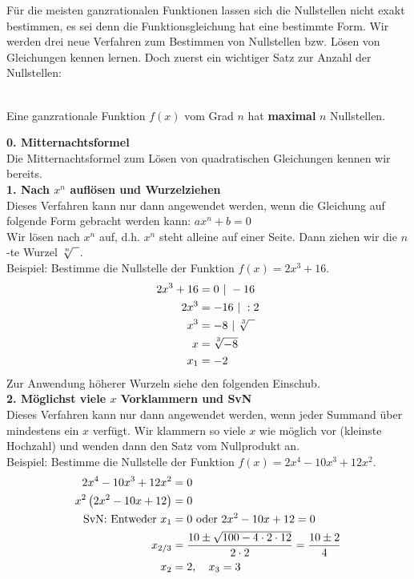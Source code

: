 Für die meisten ganzrationalen Funktionen lassen sich die Nullstellen nicht exakt bestimmen, es sei denn die Funktionsgleichung hat eine bestimmte Form. Wir werden drei neue Verfahren zum Bestimmen von Nullstellen bzw. Lösen von Gleichungen kennen lernen. Doch zuerst ein wichtiger Satz zur Anzahl der Nullstellen:
\begin{tcolorbox}\centering
	\textcolor{loestc}{\vspace{0.3cm}\\Eine ganzrationale Funktion \(f(x)\) vom Grad \(n\) hat \textbf{maximal} \(n\) Nullstellen.\\ \vspace{0.5cm}}
\end{tcolorbox}
\textbf{0. Mitternachtsformel}\\
Die Mitternachtsformel zum Lösen von quadratischen Gleichungen kennen wir bereits.\\
\textbf{1. Nach \(x^n\) auflösen und Wurzelziehen}\\
Dieses Verfahren kann nur dann angewendet werden, wenn die Gleichung auf folgende Form gebracht werden kann: \(ax^n+b=0\)\\
Wir lösen nach \(x^n\) auf, d.h. \(x^n\) steht alleine auf einer Seite. Dann ziehen wir die \(n\)-te Wurzel \(\sqrt[\leftroot{0}\uproot{2}n]{\phantom{x}}\).\\
Beispiel: Bestimme die Nullstelle der Funktion \(f(x)=2x^3+16\).
\textcolor{loes}{\begin{align*}\large
		2x^3+16&=0\ |\ -16\\
		2x^3&=-16\ |\ :2\\
		x^3&=-8\ |\ \sqrt[\leftroot{0}\uproot{2}3]{\phantom{x}}\\
		x&=\sqrt[\leftroot{0}\uproot{2}3]{-8}\\
		x_1&=-2
\end{align*}}
Zur Anwendung höherer Wurzeln siehe den folgenden Einschub.\\
\textbf{2. Möglichst viele \(x\) Vorklammern und SvN}\\
Dieses Verfahren kann nur dann angewendet werden, wenn jeder Summand über mindestens ein \(x\) verfügt. Wir klammern so viele \(x\) wie möglich vor (kleinste Hochzahl) und wenden dann den Satz vom Nullprodukt an.\\
Beispiel: Bestimme die Nullstelle der Funktion \(f(x)=2x^4-10x^3+12x^2\).
\textcolor{loes}{\begin{align*}\large
		2x^4-10x^3+12x^2&=0\\
		x^2\left(2x^2-10x+12\right) &=0\\
		\text{SvN: Entweder }x_1&=0 \text{ oder }2x^2-10x+12=0\\
		x_{2/3}&=\frac{10\pm\sqrt{100-4\cdot 2\cdot 12}}{2\cdot 2}=\frac{10\pm 2}{4}\\
		x_2&=2,\quad x_3=3
\end{align*}}\newpage
